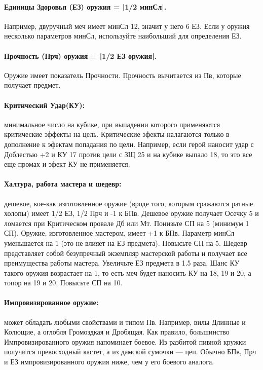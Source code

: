 \paragraph{Единицы Здоровья (ЕЗ) оружия = |1/2 минСл|.} Например, двуручный меч имеет минСл 12, значит у него 6 ЕЗ. Если у оружия несколько параметров минСл, используйте наибольший для определения ЕЗ.
\paragraph{Прочность (Прч) оружия = |1/2 ЕЗ оружия|.} Оружие имеет показатель Прочности. Прочность вычитается из Пв, которые получает предмет.
\paragraph{Критический Удар(КУ):} минимальное число на кубике, при выпадении которого применяются критические эффекты на цель. Критические эфекты налагаются только в дополнение к эфектам попадания по цели. Например, если герой наносит удар с Доблестью +2 и КУ 17 против цели с ЗЩ 25 и на кубике выпало 18, то это все еще промах и эфект КУ не применяется.
\paragraph{Халтура, работа мастера и шедевр:} дешевое, кое-как изготовленное оружие (вроде того, которым сражаются ратные холопы) имеет 1/2 ЕЗ, 1/2 Прч и -1 к БПв. Дешевое оружие получает Осечку 5 и ломается при Критическом провале Дб или Мт. Понизьте СП на 5 (минимум 1 СП).
\newline Оружие, изготовленное мастером, имеет +1 к БПв. Параметр минСл уменьшается на 1 (это не влияет на ЕЗ предмета). Повысьте СП на 5.
\newline
Шедевр представляет собой безупречный экземпляр мастерской работы и получает все преимущества работы мастера. Увеличьте ЕЗ предмета в 1.5 раза. Шанс КУ такого оружия возрастает на 1, то есть меч будет наносить КУ на 18, 19 и 20, а топор на 19 и 20. Повысьте СП на 10.
\paragraph{Импровизированное оружие:} может обладать любыми свойствами и типом Пв. Например, вилы Длинные и Колющие, а оглобля Громоздкая и Дробящая. Как правило, большинство Импровизированного оружия напоминает боевое. Из разбитой пивной кружки получится превосходный кастет, а из дамской сумочки — цеп. Обычно БПв, Прч и ЕЗ импровизированного оружия
ниже, чем у его боевого аналога.
